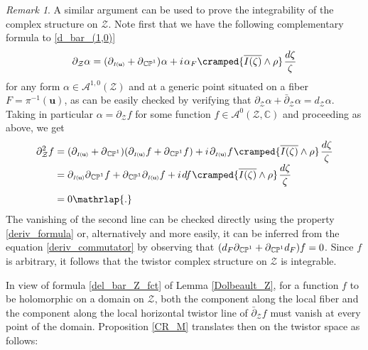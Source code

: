 \documentclass[11pt]{amsart}
\theoremstyle{remark}
\newtheorem*{remark}{Remark}
\theoremstyle{remark}
\theoremstyle{definition}
\theoremstyle{definition}
\theoremstyle{definition}
\newcommand{\Iu}{\scriptscriptstyle{I\nhp(\nhp\mathbf{u}\hspace{-0.25pt})}} %
\newcommand{\0}{{\scriptstyle 0'}} %
\newcommand{\1}{{\scriptstyle 1'}}
\newcommand{\pt}{\hspace{1pt}} %
\newcommand{\hp}{\hspace{0.5pt}} %
\newcommand{\nhp}{\hspace{-0.5pt}} %
\begin{document}
\begin{remark} 

A similar argument can be used to prove the integrability of the complex structure on $\mathcal{Z}$. Note first that we have the following complementary formula to \eqref{d_bar_(1,0)} 
\begin{equation}
\partial_{\mathcal{Z}}\alpha = (\partial_{\Iu} + \partial_{\hp\smash{\mathbb{CP}^1}}) \hp \alpha + i\pt \alpha_F \cramped{\overline{I(\zeta)} \wedge \rho} \pt \frac{d\zeta}{\zeta}
\end{equation}
for any form $\alpha \in \mathscr{A}^{1,0}(\mathcal{Z})$ and at a generic point situated on a fiber $F = \pi^{-1}(\mathbf{u})$, as can be easily checked by verifying that $\partial_{\mathcal{Z}}\alpha + \bar{\partial}_{\mathcal{Z}}\alpha = d_{\mathcal{Z}}\alpha$. Taking in particular $\alpha = \partial_{\mathcal{Z}}f$ for some function $f \in \mathscr{A}^0(\mathcal{Z},\mathbb{C})$ and proceeding as above, we get
{\allowdisplaybreaks
\begin{align}
\partial_{\mathcal{Z}}^2 f & = (\partial_{\Iu} + \partial_{\hp\smash{\mathbb{CP}^1}})(\partial_{\Iu} f + \partial_{\hp\smash{\mathbb{CP}^1}} f) + i\pt \partial_{\Iu}f \hp \cramped{\overline{I(\zeta)} \wedge \rho} \pt \frac{d\zeta}{\zeta} \nonumber \\[-3pt]
& = \partial_{\Iu}\partial_{\hp\smash{\mathbb{CP}^1}} f + \partial_{\hp\smash{\mathbb{CP}^1}}\partial_{\Iu} f + i\pt df \hp \cramped{\overline{I(\zeta)} \wedge \rho} \pt \frac{d\zeta}{\zeta} \nonumber \\[3.5pt]
& = 0 \mathrlap{.} \nonumber
\end{align}
}%
The vanishing of the second line can be checked directly using the property \eqref{deriv_formula} or, alternatively and more easily, it can be inferred from the equation \eqref{deriv_commutator} by observing that $(d_F \partial_{\hp\smash{\mathbb{CP}^1}} + \partial_{\hp\smash{\mathbb{CP}^1}} d_F) f = 0$. Since $f$ is arbitrary, it follows that the twistor complex structure on $\mathcal{Z}$ is integrable.

\end{remark}

In view of formula \eqref{del_bar_Z_fct} of Lemma \ref{Dolbeault_Z}, for a function $f$ to be holomorphic on a domain on $\mathcal{Z}$, both the component along the local fiber and the component along the local horizontal twistor line of $\bar{\partial}_{\mathcal{Z}} f$ must vanish at every point of the domain. Proposition \ref{CR_M} translates then on the twistor space as follows: 
\end{document}
